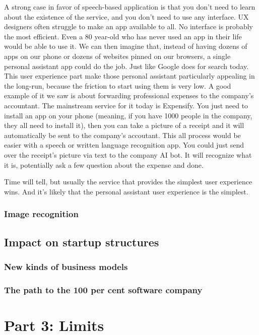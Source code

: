 \documentclass[12pt]{article}
\begin{document}
A strong case in favor of speech-based application is that you don't need to learn about the existence of the service, and you don't need to use any interface. UX designers often struggle to make an app available to all. No interface is probably the most efficient. Even a 80 year-old who has never used an app in their life would be able to use it. 
We can then imagine that, instead of having dozens of apps on our phone or dozens of websites pinned on our browsers, a single personal assistant app could do the job. Just like Google does for search today. This user experience part make those personal assistant particularly appealing in the long-run, because the friction to start using them is very low. 
A good example of it we saw is about forwarding professional expenses to the company's accountant. The mainstream service for it today is Expensify. You just need to install an app on your phone (meaning, if you have 1000 people in the company, they all need to install it), then you can take a picture of a receipt and it will automatically be sent to the company's accoutant. This all process would be easier with a speech or written language recognition app. You could just send over the receipt's picture via text to the company AI bot. It will recognize what it is, potentially ask a few question about the expense and done. 

Time will tell, but usually the service that provides the simplest user experience wins. And it's likely that the personal assistant user experience is the simplest. 


\subsection{Image recognition}

\section{Impact on startup structures}

\subsection{New kinds of business models}

\subsection{The path to the 100 per cent software company}

\chapter{Part 3: Limits}
\end{document}
